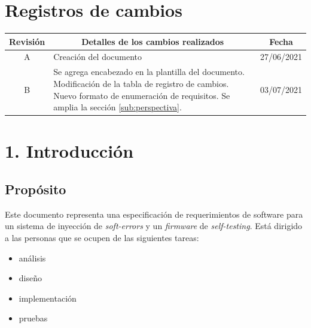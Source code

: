 \documentclass[
11pt, %
codirector, %
]{charter}
\begin{document}
\maketitle
\thispagestyle{empty}
\pagebreak


\thispagestyle{empty}
{\setlength{\parskip}{0pt}
\tableofcontents{}
}
\pagebreak


\section*{Registros de cambios}
\label{sec:registro}

\begin{table}[ht]
\label{tab:registro}
\centering
\begin{tabularx}{\linewidth}{@{}|c|X|c|@{}}
\hline
\rowcolor[HTML]{C0C0C0} 
Revisión & \multicolumn{1}{c|}{\cellcolor[HTML]{C0C0C0}Detalles de los cambios realizados} & Fecha      \\ \hline
A & Creación del documento & 27/06/2021 \\ \hline
B & Se agrega encabezado en la plantilla del documento. \newline
	Modificación de la tabla de registro de cambios. \newline
	Nuevo formato de enumeración de requisitos.\newline
	Se amplia la sección \ref{sub:perspectiva}. & 03/07/2021 \\ \hline
\end{tabularx}
\end{table}

\pagebreak

\section{1. Introducción}
\label{sec:introduccion}

\subsection{Propósito}
\label{sub:proposito}

Este documento representa una especificación de requerimientos de software para un sistema de inyección de \emph{soft-errors} y un \emph{firmware} de \emph{self-testing}.
Está dirigido a las personas que se ocupen de las siguientes tareas:
\begin{itemize}
	\item análisis
	\item diseño
	\item implementación
	\item pruebas
\end{itemize}
\end{document}
